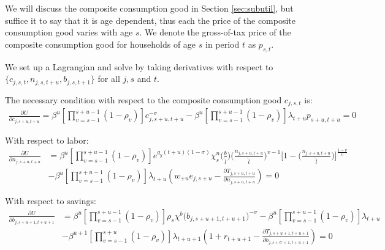We will discuss the composite consumption good in Section \ref{sec:subutil}, but suffice it to say that it is age dependent, thus each the price of the composite consumption good varies with age $s$.  We denote the gross-of-tax price of the composite consumption good for households of age $s$ in period $t$ as $p_{s,t}$.

    We set up a Lagrangian and solve by taking derivatives with respect to $\{c_{j,s,t},n_{j,s,t+u},b_{j,s,t+1}\}$ for all $j,s$ and $t$.

      The necessary condition with respect to the composite consumption good $c_{j,s,t}$ is:
    \begin{equation}\label{Eqcfoc}
      \begin{split}
      \frac{\partial U}{\partial c_{j,s+u,t+u}}  = \beta^u\left[\prod_{v=s-1}^{s+u-1}(1-\rho_v)\right] c_{j,s+u,t+u}^{-\sigma} - \beta^u\left[\prod_{v=s-1}^{s+u-1}(1-\rho_v)\right]  \lambda_{t+u} p_{s+u,t+u} = 0
        \end{split}
    \end{equation}

    With respect to labor:
    \begin{equation}\label{Eqnfoc}
      \begin{split}
      \frac{\partial U}{\partial n_{j,s+u,t+u}} & = \beta^u\left[\prod_{v=s-1}^{s+u-1}(1-\rho_v)\right] e^{g_y (t+u)(1-\sigma)}\chi^n_{s}\biggl(\frac{b}{\tilde{l}}\biggr)\biggl(\frac{n_{j,s+u,t+u}}{\tilde{l}}\biggr)^{v-1}\Biggl[1 - \biggl(\frac{n_{j,s+u,t+u}}{\tilde{l}}\biggr)\Biggr]^{\frac{1-v}{v}} \\
      & -  \beta^u\left[\prod_{v=s-1}^{s+u-1}(1-\rho_v)\right]\lambda_{t+u} \left( w_{+u} e_{j,s+u} - \frac{\partial T_{j,s+u,t+u}}{\partial n_{j,s+u,t+u}} \right)= 0
        \end{split}
    \end{equation}

    With respect to savings:
    \begin{equation}\label{Eqbfoc}
      \begin{split}
      \frac{\partial U}{\partial b_{j,s+u+1,t+u+1}} & = \beta^u\left[\prod_{v=s-1}^{s+u-1}(1-\rho_v)\right] \rho_s\chi^b\bigl(b_{j,s+u+1,t+u+1}\bigr)^{-\sigma} - \beta^u\left[\prod_{v=s-1}^{s+u-1}(1-\rho_v)\right] \lambda_{t+u}  \\\ & - \beta^{u+1}\left[\prod_{v=s-1}^{s+u}(1-\rho_v)\right] \lambda_{t+u+1} \left( 1 + r_{t+u+1} - \frac{\partial T_{j,s+u+1,t+u+1}}{\partial b_{j,s+U+1,t+u+1}} \right)= 0
      \end{split}
    \end{equation}

